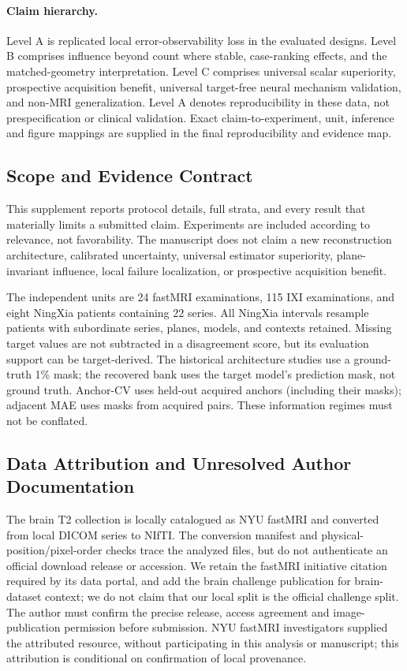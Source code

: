 \paragraph{Claim hierarchy.}
Level A is replicated local error-observability loss in the evaluated designs. Level B comprises influence beyond count where stable, case-ranking effects, and the matched-geometry interpretation. Level C comprises universal scalar superiority, prospective acquisition benefit, universal target-free neural mechanism validation, and non-MRI generalization. Level A denotes reproducibility in these data, not prespecification or clinical validation. Exact claim-to-experiment, unit, inference and figure mappings are supplied in the final reproducibility and evidence map.

\subsection{Scope and Evidence Contract}
This supplement reports protocol details, full strata, and every result that materially limits a submitted claim. Experiments are included according to relevance, not favorability. The manuscript does not claim a new reconstruction architecture, calibrated uncertainty, universal estimator superiority, plane-invariant influence, local failure localization, or prospective acquisition benefit.

The independent units are 24 fastMRI examinations, 115 IXI examinations, and eight NingXia patients containing 22 series. All NingXia intervals resample patients with subordinate series, planes, models, and contexts retained. Missing target values are not subtracted in a disagreement score, but its evaluation support can be target-derived. The historical architecture studies use a ground-truth 1\% mask; the recovered bank uses the target model's prediction mask, not ground truth. Anchor-CV uses held-out acquired anchors (including their masks); adjacent MAE uses masks from acquired pairs. These information regimes must not be conflated.


\subsection{Data Attribution and Unresolved Author Documentation}
The brain T2 collection is locally catalogued as NYU fastMRI and converted from local DICOM series to NIfTI. The conversion manifest and physical-position/pixel-order checks trace the analyzed files, but do not authenticate an official download release or accession. We retain the fastMRI initiative citation required by its data portal, and add the brain challenge publication for brain-dataset context; we do not claim that our local split is the official challenge split. The author must confirm the precise release, access agreement and image-publication permission before submission. NYU fastMRI investigators supplied the attributed resource, without participating in this analysis or manuscript; this attribution is conditional on confirmation of local provenance.

